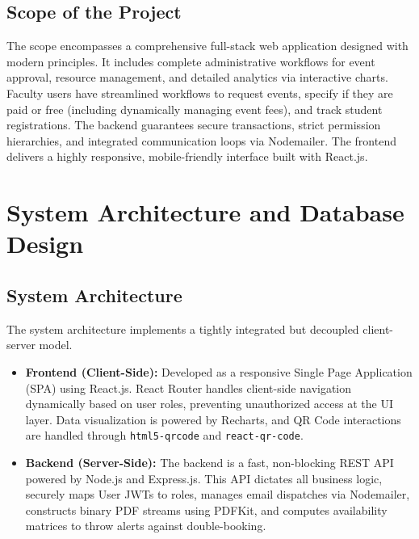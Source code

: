 \documentclass[12pt, a4paper]{report}
\begin{document}
\section{Scope of the Project}
The scope encompasses a comprehensive full-stack web application designed with modern principles. It includes complete administrative workflows for event approval, resource management, and detailed analytics via interactive charts. Faculty users have streamlined workflows to request events, specify if they are paid or free (including dynamically managing event fees), and track student registrations. The backend guarantees secure transactions, strict permission hierarchies, and integrated communication loops via Nodemailer. The frontend delivers a highly responsive, mobile-friendly interface built with React.js.

\chapter{System Architecture and Database Design}

\section{System Architecture}
The system architecture implements a tightly integrated but decoupled client-server model. 
\begin{itemize}
    \item \textbf{Frontend (Client-Side):} Developed as a responsive Single Page Application (SPA) using React.js. React Router handles client-side navigation dynamically based on user roles, preventing unauthorized access at the UI layer. Data visualization is powered by Recharts, and QR Code interactions are handled through \texttt{html5-qrcode} and \texttt{react-qr-code}.
    \item \textbf{Backend (Server-Side):} The backend is a fast, non-blocking REST API powered by Node.js and Express.js. This API dictates all business logic, securely maps User JWTs to roles, manages email dispatches via Nodemailer, constructs binary PDF streams using PDFKit, and computes availability matrices to throw alerts against double-booking.
\end{itemize}
\end{document}
